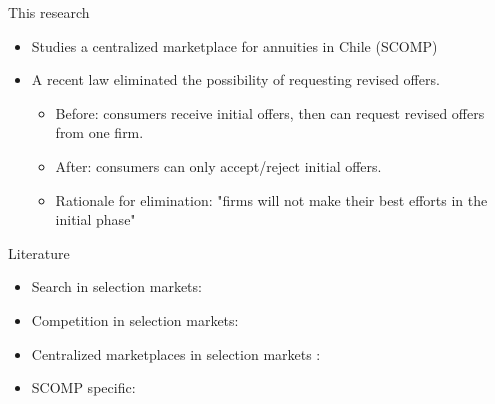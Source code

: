 \documentclass[10pt,aspectratio=169]{beamer}
\begin{document}

\begin{frame}{This research}
\begin{itemize}
    \item Studies a centralized marketplace for annuities in Chile (SCOMP)
    \item A recent law eliminated the possibility of requesting revised offers.
    \begin{itemize}
        \item Before: consumers receive initial offers, then can request revised offers from one firm.
        \item After: consumers can only accept/reject initial offers.
        \item Rationale for elimination: "firms will not make their best efforts in the initial phase"
    \end{itemize}
\end{itemize}
\end{frame}

\begin{frame}{Literature}
\begin{itemize}
    \item Search in selection markets: \textcite{allen_search_2019} %

    \item Competition in selection markets: \textcite{mahoney_imperfect_2017, crawford_asymmetric_2018,
    cuesta_price_2018, cosconati_competing_2025} 

    \item Centralized marketplaces in selection markets : \textcite{abaluck_when_2023,tebaldi_estimating_2025} 
    
    \item SCOMP specific: \textcite{boehm_intermediation_2024, illanes_retirement_2019, alcalde_intermediary_2021}
    

\end{itemize}
\note{
\textcolor{blue}{ ADD THE CONTRIBUTIONS TO EACH LITERATURE AND ADD MORE PAPERS}
}
\end{frame}
\end{document}
